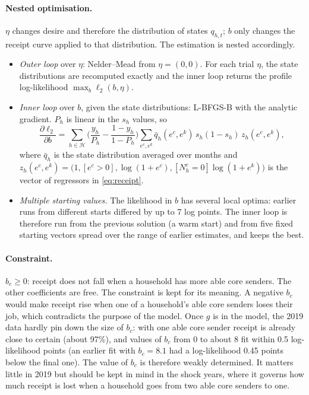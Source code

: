 \documentclass[11pt]{article}
\begin{document}
\paragraph{Nested optimisation.} $\eta$ changes desire and therefore the distribution of states $q_{h,t}$; $b$ only changes the receipt curve applied to that distribution. The estimation is nested accordingly.
\begin{itemize}[leftmargin=*]
\item \emph{Outer loop} over $\eta$: Nelder--Mead from $\eta = (0, 0)$. For each trial $\eta$, the state distributions are recomputed exactly and the inner loop returns the profile log-likelihood $\max_b \ell_2(b, \eta)$.
\item \emph{Inner loop} over $b$, given the state distributions: L-BFGS-B with the analytic gradient. $P_h$ is linear in the $s_h$ values, so
\begin{equation}
\frac{\partial \ell_2}{\partial b} = \sum_{h \in \mathcal{H}} \Big(\frac{y_h}{P_h} - \frac{1 - y_h}{1 - P_h}\Big) \sum_{e^c, e^k} \bar q_h(e^c, e^k)\, s_h (1 - s_h)\, z_h(e^c, e^k),
\end{equation}
where $\bar q_h$ is the state distribution averaged over months and $z_h(e^c, e^k) = \big(1, [e^c > 0], \log(1 + e^c), [N^c_h = 0]\log(1 + e^k)\big)$ is the vector of regressors in \eqref{eq:receipt}.
\item \emph{Multiple starting values.} The likelihood in $b$ has several local optima: earlier runs from different starts differed by up to 7 log points. The inner loop is therefore run from the previous solution (a warm start) and from five fixed starting vectors spread over the range of earlier estimates, and keeps the best.
\end{itemize}

\paragraph{Constraint.} $b_c \ge 0$: receipt does not fall when a household has more able core senders. The other coefficients are free. The constraint is kept for its meaning. A negative $b_c$ would make receipt rise when one of a household's able core senders loses their job, which contradicts the purpose of the model. Once $g$ is in the model, the 2019 data hardly pin down the size of $b_c$: with one able core sender receipt is already close to certain (about 97\%), and values of $b_c$ from 0 to about 8 fit within 0.5 log-likelihood points (an earlier fit with $b_c = 8.1$ had a log-likelihood 0.45 points below the final one). The value of $b_c$ is therefore weakly determined. It matters little in 2019 but should be kept in mind in the shock years, where it governs how much receipt is lost when a household goes from two able core senders to one.
\end{document}
